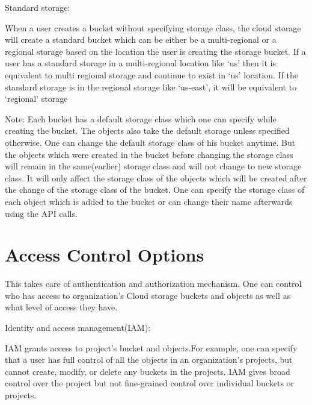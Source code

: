 \documentclass[9pt,twocolumn,twoside]{../../styles/osajnl}
\begin{document}
\begin{flushleft}
 Standard storage: 

When a user creates a bucket without specifying storage class, the cloud storage  will create a standard bucket which can be either be a multi-regional or a regional storage based on the location the user is creating the storage bucket. If a user has a standard storage in a multi-regional location like ‘us’ then it is equivalent to multi regional storage and continue to exist in ‘us’ location. If the standard storage is in the regional storage like ‘us-east’, it will be equivalent to ‘regional’ storage 

\end{flushleft}


\begin{flushleft}
 Note:
Each bucket has a default storage class which one can specify while creating the bucket. The objects also take the default storage unless specified otherwise. One can change the default storage class of  his bucket anytime. But the objects which were created in the bucket before changing the storage class will remain in the same(earlier) storage class and will not change to new storage class. It will only affect the storage class of the objects which will be created after the change of the storage class of the bucket.
One can specify the storage class of each object which is added to the bucket or can change their name afterwards using the API calls. 

\end{flushleft}



\section{Access Control Options}

This takes care of authentication and authorization mechanism. One can control who has access to organization's Cloud storage buckets and objects as well as what level of access they have. 



\begin{flushleft}
Identity and access management(IAM):

IAM grants access to project's bucket and objects.For example, one can specify that a user has full control of all the objects in an organization's projects, but cannot create, modify, or delete any buckets in the projects. IAM gives broad control over the project but not fine-grained control over individual buckets or projects.
\end{flushleft}
\end{document}
